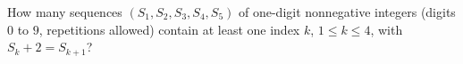 How many sequences $(S_1,S_2,S_3,S_4,S_5)$ of one-digit nonnegative integers (digits $0$ to $9$, repetitions allowed) contain at least one index $k$, $1\le k\le4$, with $S_k+2=S_{k+1}$?
